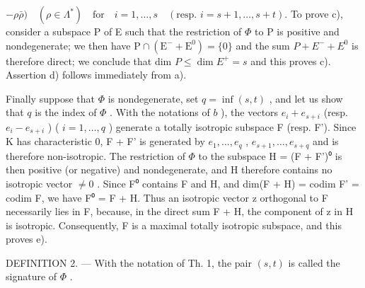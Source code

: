 \(-\rho\bar{\rho}) \quad (\rho\in\Lambda^{*}) \quad \text{for} \quad i=1,\ldots,s \quad (\text{resp. } i=s+1,\ldots,s+t).\) To prove c), consider a subspace P of E such that the restriction of \(\Phi\) to P is positive and nondegenerate; we then have \(\mathrm{P}\cap(\mathrm{E}^{-}+\mathrm{E}^{0})=\{0\}\) and the sum \(P+E^{-}+E^{0}\) is therefore direct; we conclude that dim \(P\leqslant\dim E^{+}=s\) and this proves c). Assertion d) follows immediately from a).

Finally suppose that \(\Phi\) is nondegenerate, set \(q = \inf (s, t)\) , and let us show that \(q\) is the index of \(\Phi\) . With the notations of \(b\) ), the vectors \(e_i + e_{s+i}\) (resp. \(e_i - e_{s+i}\) ) ( \(i = 1, \ldots, q\) ) generate a totally isotropic subspace F (resp. F'). Since K has characteristic 0, F + F' is generated by \(e_1, \ldots, e_q\) , \(e_{s+1}, \ldots, e_{s+q}\) and is therefore non-isotropic. The restriction of \(\Phi\) to the subspace H = (F + F')⁰ is then positive (or negative) and nondegenerate, and H therefore contains no isotropic vector \(\neq 0\) . Since F⁰ contains F and H, and dim(F + H) = codim F' = codim F, we have F⁰ = F + H. Thus an isotropic vector z orthogonal to F necessarily lies in F, because, in the direct sum F + H, the component of z in H is isotropic. Consequently, F is a maximal totally isotropic subspace, and this proves e).

DEFINITION 2. --- With the notation of Th. 1, the pair \((s,t)\) is called the signature of \(\Phi\) .

